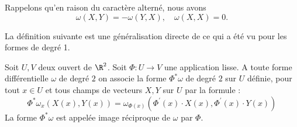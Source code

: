 

Rappelons qu'en raison du caractère alterné, nous avons
\[\omega(X,Y)=-\omega(Y,X), \quad \omega(X,X)=0.\]


La définition suivante est une généralisation directe de ce qui a été vu pour les formes de degré 1. 
\begin{fdefn}
Soit $U,V$ deux ouvert de $\R^2$. Soit $\Phi \colon U \to V$ une application lisse. A toute forme différentielle $\omega$ de degré $2$ on associe la forme $\Phi^\ast \omega$ de degré $2$ sur $U$ définie, pour tout $x \in U$ et tous champs de vecteurs $X,Y$ sur $U$ par la formule :
\[\Phi^\ast\omega_x(X(x), Y(x)) = \omega_{\Phi(x)}(\Phi^\prime(x)\cdot X(x),\Phi^\prime(x)\cdot Y(x))
\]
La forme $\Phi^*\omega$ est appelée image réciproque de $\omega$ par $\Phi$.
\end{fdefn}

